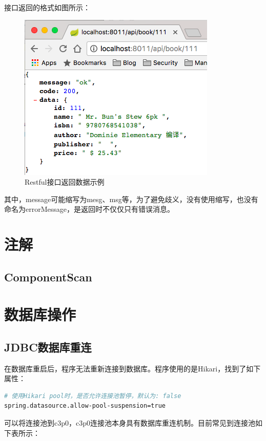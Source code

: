 \documentclass[letter]{book}
\begin{document}
接口返回的格式如图所示：

\begin{figure}[htbp]
	\centering
	\includegraphics[scale=0.7]{restresponse.png}
	\caption{Restful接口返回数据示例}
	\label{fig:restresponse}
\end{figure}

其中，message可能缩写为mesg、msg等，为了避免歧义，没有使用缩写，也没有命名为errorMessage，是返回时不仅仅只有错误消息。

\section{注解}

\subsection{ComponentScan}

\section{数据库操作}

\subsection*{JDBC数据库重连}

在数据库重启后，程序无法重新连接到数据库。程序使用的是Hikari，找到了如下属性：

\begin{lstlisting}[language=Bash]
# 使用Hikari pool时，是否允许连接池暂停，默认为: false
spring.datasource.allow-pool-suspension=true
\end{lstlisting}

可以将连接池到c3p0，c3p0连接池本身具有数据库重连机制。目前常见到连接池如下表所示：
\end{document}
